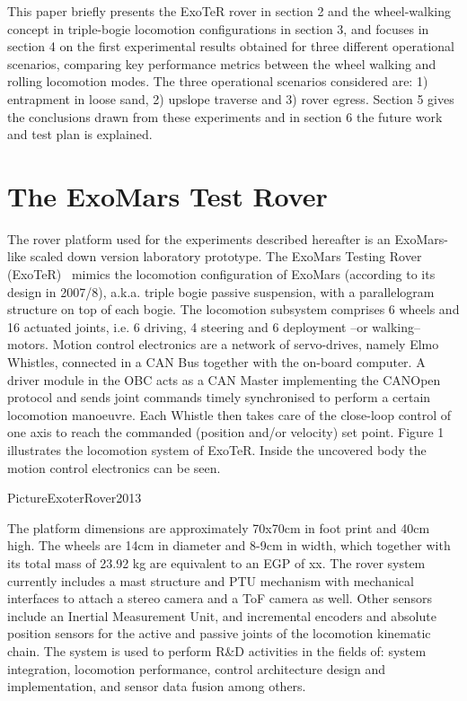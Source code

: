 \documentclass[a4paper,twocolumn]{esapub2005} %
\begin{document}
This paper briefly presents the ExoTeR rover in section 2 and the wheel-walking concept in triple-bogie locomotion configurations in section 3, and focuses in section 4 on the first experimental results obtained for three different operational scenarios, comparing key performance metrics between the wheel walking and rolling locomotion modes. The three operational scenarios considered are: 1) entrapment in loose sand, 2) upslope traverse and 3) rover egress. Section 5 gives the conclusions drawn from these experiments and in section 6 the future work and test plan is explained.



\section{The ExoMars Test Rover}
The rover platform used for the experiments described hereafter is an ExoMars-like scaled down version laboratory prototype. The ExoMars Testing Rover (ExoTeR)~\cite{Azkarate2015} mimics the locomotion configuration of ExoMars (according to its design in 2007/8), a.k.a. triple bogie passive suspension, with a parallelogram structure on top of each bogie. The locomotion subsystem comprises 6 wheels and 16 actuated joints, i.e. 6 driving, 4 steering and 6 deployment –or walking– motors. 
Motion control electronics are a network of servo-drives, namely Elmo Whistles, connected in a CAN Bus together with the on-board computer. A driver module in the OBC acts as a CAN Master implementing the CANOpen protocol and sends joint commands timely synchronised to perform a certain locomotion manoeuvre. Each Whistle then takes care of the close-loop control of one axis to reach the commanded (position and/or velocity) set point. 
Figure 1 illustrates the locomotion system of ExoTeR. Inside the uncovered body the motion control electronics can be seen.

PictureExoterRover2013

The platform dimensions are approximately 70x70cm in foot print and 40cm high. The wheels are 14cm in diameter and 8-9cm in width, which together with its total mass of 23.92 kg are equivalent to an EGP of xx.
The rover system currently includes a mast structure and PTU mechanism with mechanical interfaces to attach a stereo camera and a ToF camera as well. Other sensors include an Inertial Measurement Unit, and incremental encoders and absolute position sensors for the active and passive joints of the locomotion kinematic chain.
The system is used to perform R\&D activities in the fields of: system integration, locomotion performance, control architecture design and implementation, and sensor data fusion among others. 
\end{document}
